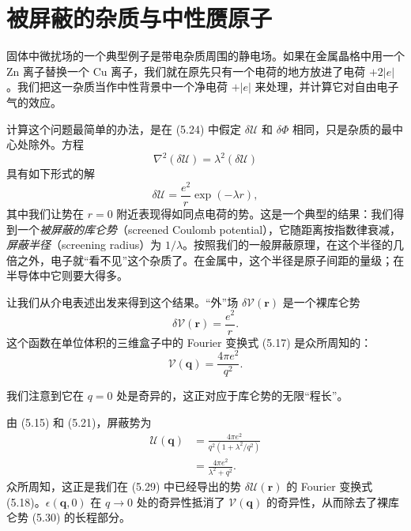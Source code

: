\section{被屏蔽的杂质与中性赝原子}

固体中微扰场的一个典型例子是带电杂质周围的静电场。如果在金属晶格中用一个 Zn 离子替换一个 Cu 离子，我们就在原先只有一个电荷的地方放进了电荷 $+2|e|$。我们把这一杂质当作中性背景中一个净电荷 $+|e|$ 来处理，并计算它对自由电子气的效应。

计算这个问题最简单的办法，是在 (5.24) 中假定 $\delta\mathcal{U}$ 和 $\delta\Phi$ 相同，只是杂质的最中心处除外。方程
\begin{equation*}
\nabla^{2}(\delta\mathcal{U})=\lambda^{2}(\delta\mathcal{U})
\tag{5.28}
\end{equation*}
具有如下形式的解
\begin{equation*}
\delta\mathcal{U}=\frac{e^{2}}{r}\exp(-\lambda r),
\tag{5.29}
\end{equation*}
其中我们让势在 $r=0$ 附近表现得如同点电荷的势。这是一个典型的结果：我们得到一个\emph{被屏蔽的库仑势}（screened Coulomb potential），它随距离按指数律衰减，\emph{屏蔽半径}（screening radius）为 $1/\lambda$。按照我们的一般屏蔽原理，在这个半径的几倍之外，电子就“看不见”这个杂质了。在金属中，这个半径是原子间距的量级；在半导体中它则要大得多。

让我们从介电表述出发来得到这个结果。“外”场 $\delta\mathcal{V}(\mathbf{r})$ 是一个裸库仑势
\begin{equation*}
\delta\mathcal{V}(\mathbf{r})=\frac{e^{2}}{r}.
\tag{5.30}
\end{equation*}
这个函数在单位体积的三维盒子中的 Fourier 变换式 (5.17) 是众所周知的：
\begin{equation*}
\mathcal{V}(\mathbf{q})=\frac{4\pi e^{2}}{q^{2}}.
\tag{5.31}
\end{equation*}


我们注意到它在 $q=0$ 处是奇异的，这正对应于库仑势的无限“程长”。

由 (5.15) 和 (5.21)，屏蔽势为
\begin{align*}
\mathcal{U}(\mathbf{q})&=\frac{4\pi e^{2}}{q^{2}\left(1+\lambda^{2}/q^{2}\right)}\\
&=\frac{4\pi e^{2}}{\lambda^{2}+q^{2}}.
\tag{5.32}
\end{align*}
众所周知，这正是我们在 (5.29) 中已经导出的势 $\delta\mathcal{U}(\mathbf{r})$ 的 Fourier 变换式 (5.18)。$\epsilon(\mathbf{q},0)$ 在 $q\to 0$ 处的奇异性抵消了 $\mathcal{V}(\mathbf{q})$ 的奇异性，从而除去了裸库仑势 (5.30) 的长程部分。

